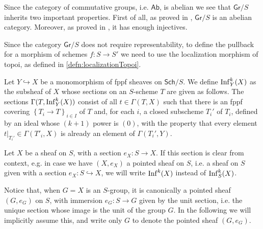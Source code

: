 \begin{rem}[]\label{rem:PropertiesGrS}
	Since the category of commutative groups, i.e. $\mathsf{Ab}$, is
	abelian we see that $\mathsf{Gr}/S$ inherits two important properties.
	First of all, as proved in 
	\cite[\href{https://stacks.math.columbia.edu/tag/03CN}{Lemma 03CN}]{SP},
	$\mathsf{Gr}/S$ is an abelian category.
	Moreover, as proved in 
	\cite[\href{https://stacks.math.columbia.edu/tag/01DP}{Theorem 01DP}]{SP},
	it has enough injectives.
\end{rem}


\begin{rem}[]
	Since the category $\mathsf{Gr}/S$ does not require representability,
	to define the pullback for a morphism of schemes $f\colon S \to S'$
	we need to use the localization morphism of topoi, as defined in
	\cref{defn:localizationTopoi}.
\end{rem}


\begin{defn}\label{defn:kInfNeighbourhood}
	Let $Y \hookrightarrow X$ be a monomorphism of fppf sheaves on \(\mathsf{Sch}/S\).
	We define $\operatorname{Inf}_Y^k(X)$ as the subsheaf of $X$
	whose sections on an $S$-scheme $T$
	are given as follows.
	The sections $\Gamma ( T , \operatorname{Inf}_Y^k(X) )$ consist of all
	$t \in \Gamma \left( T, X \right)$ such that
	there is an fppf covering $\left\{ T_{ i } \to T \right\}_{ i \in I }$
	of $T$ and, for each $i$, a closed subscheme $T_i'$ of $T_i$,
	defined by an ideal whose $(k+1)$ power is $(0)$,
	with the property that every element $\left.t\right|_{T_i'} \in \Gamma(T'_i, X)$
	is already an element of $\Gamma(T_i', Y)$.
\end{defn}


\begin{ntt}
	Let $X$ be a sheaf on $S$, with a section $e_X\colon S \to X$.
	If this section is clear from context, e.g. in case we have
	$(X, e_X)$ a pointed sheaf on $S$, i.e. a sheaf on $S$
	given with a section $e_X\colon S \hookrightarrow X$,
	we will write $\operatorname{Inf}^k(X)$
	instead of $\operatorname{Inf}_S^k(X)$.
\end{ntt}


\begin{rem}[]
	Notice that, when $G = X$ is an $S$-group, it is canonically a
	pointed sheaf $\left(G, e_G\right)$ on $S$, with immersion $e_G\colon S \to G$
	given by the unit section, i.e. the unique section whose image
	is the unit of the group $G$.
	In the following we will implicitly assume this, and write only
	$G$ to denote the pointed sheaf $(G, e_G)$.
\end{rem}


